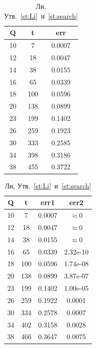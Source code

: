 \newpage
\begin{table}[h]
	\begin{minipage}{0.48\textwidth}
		\caption{Хэмминг, Утв.~\ref{st:Ham}~и~\ref{st:search}}
		\centering
		\begin{tabular}{|c|c|c|}
			\hline Q & t & err \\ \hline
			10 & 7 & 0.0007 \\ \hline
			12 & 18 & 0.0047 \\ \hline
			14 & 38 & 0.0155 \\ \hline
			16 & 65 & 0.0339 \\ \hline
			18 & 100 & 0.0596 \\ \hline
			20 & 138 & 0.0899 \\ \hline
			23 & 199 & 0.1402 \\ \hline
			26 & 259 & 0.1923 \\ \hline
			30 & 333 & 0.2585 \\ \hline
			34 & 398 & 0.3186 \\ \hline
			38 & 455 & 0.3722 \\ \hline
		\end{tabular}
	\end{minipage}
	\hfill
	\begin{minipage}{0.48\textwidth}
		\caption{Ли, Утв.~\ref{st:Li}~и~\ref{st:search}}
		\centering
		\begin{tabular}{|c|c|c|c|}
			\hline Q & t & err1 & err2 \\ \hline
			10 & 7 & 0.0007 & $\approx 0$ \\ \hline
			12 & 18 & 0.0047 & $\approx 0$ \\ \hline
			14 & 38 & 0.0155 & $\approx 0$ \\ \hline
			16 & 65 & 0.0339 & 2.32e-10 \\ \hline
			18 & 100 & 0.0596 & 1.74e-08 \\ \hline
			20 & 138 & 0.0899 & 3.87e-07 \\ \hline
			23 & 199 & 0.1402 & 1.00e-05 \\ \hline
			26 & 259 & 0.1922 & 0.0001 \\ \hline
			30 & 334 & 0.2578 & 0.0007 \\ \hline
			34 & 402 & 0.3158 & 0.0028 \\ \hline
			38 & 466 & 0.3647 & 0.0075 \\ \hline
		\end{tabular}
	\end{minipage}
\end{table}

